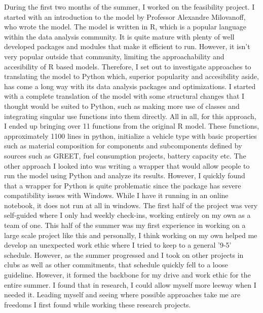 \documentclass{article}
\begin{document}
During the first two months of the summer, I worked on the feasibility project. I started with an introduction to the model by Professor Alexandre Milovanoff, who wrote the model. The model is written in R, which is a popular language within the data analysis community. It is quite mature with plenty of well developed packages and modules that make it efficient to run. However, it isn't very popular outside that community, limiting the approachability and accesibility of R based models. Therefore, I set out to investigate approaches to translating the model to Python which, superior popularity and accesibility aside, has come a long way with its data analysis packages and optimizations. I started with a complete translation of the model with some structural changes that I thought would be suited to Python, such as making more use of classes and integrating singular use functions into them directly. All in all, for this approach, I ended up bringing over 11 functions from the original R model. These functions, approximately 1100 lines in python, initialize a vehicle type with basic properties such as material composition for components and subcomponents defined by sources such as GREET, fuel consumption projects, battery capacity etc. The other approach I looked into was writing a wrapper that would allow people to run the model using Python and analyze its results. However, I quickly found that a wrapper for Python is quite problematic since the package has severe compatibility issues with Windows. While I have it running in an online notebook, it does not run at all in windows. The first half of the project was very self-guided where I only had weekly check-ins, working entirely on my own as a team of one. This half of the summer was my first experience in working on a large scale project like this and personally, I think working on my own helped me develop an unexpected work ethic where I tried to keep to a general '9-5' schedule. However, as the summer progressed and I took on other projects in clubs as well as other commitments, that schedule quickly fell to a loose guideline. However, it formed the backbone for my drive and work ethic for the entire summer. I found that in research, I could allow myself more leeway when I needed it. Leading myself and seeing where possible approaches take me are freedoms I first found while working these research projects.\\
\end{document}

